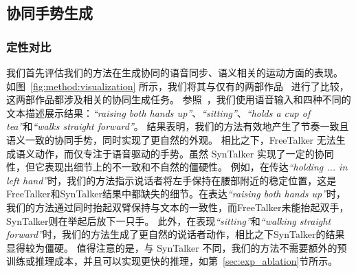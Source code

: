 \subsection{协同手势生成}
\subsubsection{定性对比}
我们首先评估我们的方法在生成协同的语音同步、语义相关的运动方面的表现。
如图~\ref{fig:method:visualization} 所示，我们将其与仅有的两部作品~\cite{yang2024freetalker,chen2024syntalker} 进行了比较，这两部作品都涉及相关的协同生成任务。
参照~\cite{chen2024syntalker}，我们使用语音输入和四种不同的文本描述展示结果：\textit{``raising both hands up''}、\textit{``sitting''}、\textit{``holds a cup of tea''}和\textit{``walks straight forward''}。
结果表明，我们的方法有效地产生了节奏一致且语义一致的协同手势，同时实现了更自然的外观。
相比之下，FreeTalker 无法生成语义动作，而仅专注于语音驱动的手势。虽然 SynTalker 实现了一定的协同性，但它表现出细节上的不一致和不自然的僵硬性。
例如，在传达\textit{``holding ... in left hand''}时，我们的方法指示说话者将左手保持在腰部附近的稳定位置，这是FreeTalker和SynTalker结果中都缺失的细节。在表达\textit{``raising both hands up''}时，我们的方法通过同时抬起双臂保持与文本的一致性，而FreeTalker未能抬起双手，SynTalker则在举起后放下一只手。
此外，在表现\textit{``sitting''}和\textit{``walking straight forward''}时，我们的方法生成了更自然的说话者动作，相比之下SynTalker的结果显得较为僵硬。
值得注意的是，与 SynTalker 不同，我们的方法不需要额外的预训练或推理成本，并且可以实现更快的推理，如第~\ref{sec:exp_ablation}节所示。



